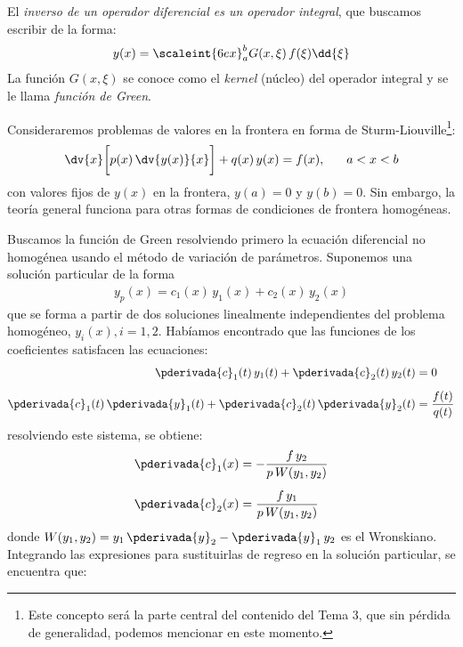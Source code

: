El \emph{inverso de un operador diferencial es un operador integral}, que buscamos escribir de la forma:
\begin{align*}
y (x) = \scaleint{6ex}_{a}^{b} G (x, \xi) \, f (\xi) \dd{\xi} 
\end{align*}
La función $G (x, \xi)$ se conoce como el \emph{kernel} (núcleo) del operador integral y se le llama \emph{función de Green}.
\par
Consideraremos problemas de valores en la frontera en forma de Sturm-Liouville\footnote{Este concepto será la parte central del contenido del Tema 3, que sin pérdida de generalidad, podemos mencionar en este momento.}:
\begin{align}
\dv{x} \bigg[ p (x) \, \dv{y (x)}{x} \bigg] + q (x) \, y (x) = f (x), \hspace{0.6cm} a < x < b
\label{eq:ecuacion_07_25}
\end{align}
con valores fijos de $y (x)$ en la frontera, $y (a) = 0$ y $y (b) = 0$. Sin embargo, la teoría general funciona para otras formas de condiciones de frontera homogéneas.
\par
Buscamos la función de Green resolviendo primero la ecuación diferencial no homogénea usando el método de variación de parámetros. Suponemos una solución particular de la forma
\begin{align*}
y_{p} (x) = c_{1} (x) \, y_{1} (x) + c_{2} (x) \, y_{2} (x)
\end{align*}
que se forma a partir de dos soluciones linealmente independientes del problema homogéneo, $y_{i} (x), i = 1, 2$. Habíamos encontrado que las funciones de los coeficientes satisfacen las ecuaciones:
\begin{align}
\begin{aligned}[b]
\pderivada{c}_{1} (t) \, y_{1} (t) + \pderivada{c}_{2} (t) \, y_{2} (t) &= 0 \\[0.5em]
\pderivada{c}_{1} (t) \, \pderivada{y}_{1} (t) + \pderivada{c}_{2} (t) \, \pderivada{y}_{2} (t) &= \dfrac{f (t)}{q (t)}
\end{aligned}
\label{eq:ecuacion_07_26}
\end{align}
resolviendo este sistema, se obtiene:
\begin{align*}
\pderivada{c}_{1} (x) &= - \dfrac{f \, y_{2}}{p \, W (y_{1}, y_{2})} \\[0.5em]
\pderivada{c}_{2} (x) &= \dfrac{f \, y_{1}}{p \, W (y_{1}, y_{2})}
\end{align*}
donde $W (y_{1}, y_{2}) = y_{1} \, \pderivada{y}_{2} - \pderivada{y}_{1} \, y_{2}$ es el Wronskiano. Integrando las expresiones para sustituirlas de regreso en la solución particular, se encuentra que:
